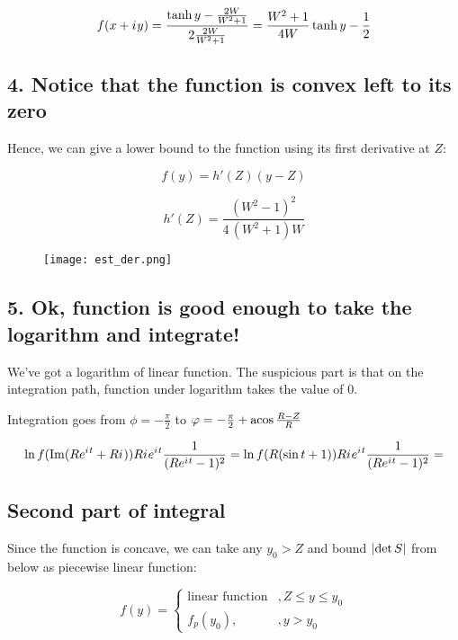 \[
f(x + {i\mkern1mu} y)
 = \frac{\tanh y - \frac{2 W}{W^2 + 1}}{2 \frac{2 W}{W^2 + 1}}
 = \frac{W^2 + 1}{4 W} \tanh y - \frac{1}{2}
\]

\subsection*{4. Notice that the function is convex left to its zero}

Hence, we can give a lower bound to the function using its first derivative at $Z$:

\[
f(y) = h'(Z) (y - Z)
\]

\[
h'(Z) = \frac{{\left(W^{2} - 1\right)}^{2}}{4 \, {\left(W^{2} + 1\right)} W}
\]

\begin{figure}[!htb]
\texttt{[image: est\_der.png]}
\end{figure}

\subsection*{5. Ok, function is good enough to take the logarithm and integrate!}
We've got a logarithm of linear function. The suspicious part is that on the integration path, function under logarithm takes the value of $0$.

Integration goes from $\phi = -\frac{\pi}{2}$ to $\phi = -\frac{\pi}{2} + \acos \frac{R - Z}{R}$

\[
\ln f(\operatorname{Im} (R e^{{i\mkern1mu} t} + R {i\mkern1mu})) R {i\mkern1mu} e^{{i\mkern1mu} t} \frac{1}{(R e^{{i\mkern1mu} t} - 1)^2} = 
\ln f(R (\sin t + 1)) R {i\mkern1mu} e^{{i\mkern1mu} t} \frac{1}{(R e^{{i\mkern1mu} t} - 1)^2} = 
\]



\subsection*{Second part of integral}
Since the function is concave, we can take any $y_0 > Z$ and bound $\abs{\det S}$ from below as piecewise linear function:

\[
f(y) =
\begin{cases}
\text{linear function} &, Z \le y \le y_0 \\
f_p(y_0),              &, y > y_0
\end{cases}
\]

